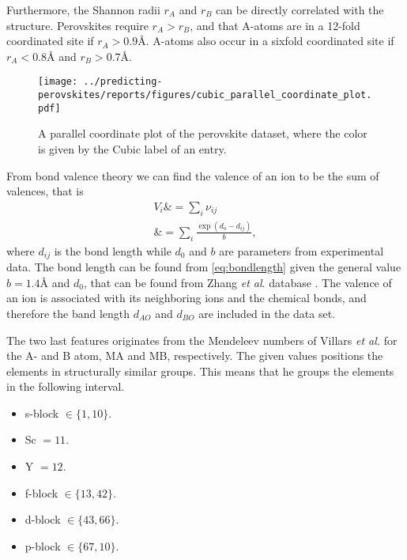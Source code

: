 Furthermore, the Shannon radii $r_A$ and $r_B$ can be directly correlated with the structure. Perovskites require $r_A > r_B$, and that A-atoms are in a 12-fold coordinated site if $r_A > 0.9\text{\AA}$. A-atoms also occur in a sixfold coordinated site if $r_A < 0.8\text{\AA}$ and $r_B >0.7\text{\AA}$.

\begin{figure}[ht!]
  \centering
  \texttt{[image: ../predicting-perovskites/reports/figures/cubic\_parallel\_coordinate\_plot.pdf]}
  \caption{A parallel coordinate plot of the perovskite dataset, where the color is given by the Cubic label of an entry.}
  \label{fig:plcp}
\end{figure}

From bond valence theory we can find the valence of an ion to be the sum of valences, that is
\begin{align}
  V_i \&= \sum_i \nu_{ij} \\
  \&= \sum_i \frac{\exp(d_o - d_{ij})}{b} \label{eq:bondlength},
\end{align}
where $d_{ij}$ is the bond length while $d_0$ and $b$ are parameters from experimental data. The bond length can be found from \ref{eq:bondlength} given the general value $b=1.4\text{\AA}$ and $d_0$, that can be found from Zhang \textit{et al}. database \cite{Zhang2007}. The valence of an ion is associated with its neighboring ions and the chemical bonds, and therefore the band length $d_{AO}$ and $d_{BO}$ are included in the data set.

The two last features originates from the Mendeleev numbers of Villars \textit{et al.} \cite{Villars2004} for the A- and B atom, MA and MB, respectively. The given values positions the elements in structurally similar groups. This means that he groups the elements in the following interval.

\begin{itemize}
  \item s-block $\in \{1,10\}$.
  \item Sc $ = 11$.
  \item Y  $ = 12$.
  \item f-block $\in \{13,42\}$.
  \item d-block $\in \{43,66\}$.
  \item p-block $\in \{67,10\}$.
\end{itemize}

